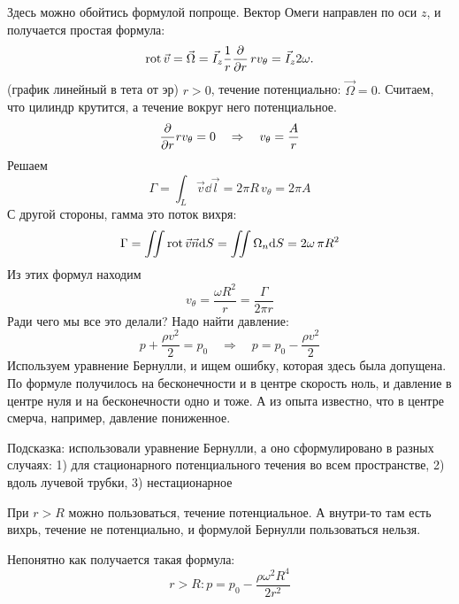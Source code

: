 Здесь можно обойтись формулой попроще. Вектор Омеги направлен по оси $z$, и получается простая формула: 
\begin{equation}
	\operatorname{rot}\vec{v}=
		\vec\Omega=
		\vec{I}_z \frac{1}{r}\pdv{r}\,rv_\theta=
		\vec{I}_z 2\omega.
\end{equation}
(график линейный в тета от эр)
$r>0$, течение потенциально: $\vec{\Omega}=0$. Считаем, что цилиндр крутится, а течение вокруг него потенциальное.
\begin{equation}
 	\pdv{r} rv_\theta=0 \quad \Rightarrow \quad v_\theta=\frac{A}{r}
 \end{equation} 
Решаем
\begin{equation}
	\Gamma=\int_L \vec{v}\dd\vec{l}=2\pi R\, v_\theta= 2\pi A
\end{equation}
С другой стороны, гамма это поток вихря:
\begin{equation}
	\Gamma=\iint \operatorname{rot}\vec{v}\vec{n}\dd S =\iint  \Omega_n \dd S = 2\omega\, \pi R^2
\end{equation}
Из этих формул находим
\begin{equation}
	v_\theta=\frac{\omega R^2}{r}=\frac{\Gamma}{2\pi r}
\end{equation}
Ради чего мы все это делали? Надо найти давление:
\begin{equation}
	p+\frac{\rho v^2}{2}=p_0 \quad \Rightarrow \quad
	p=p_0-\frac{\rho v^2}{2}
\end{equation}
Используем уравнение Бернулли, и ищем ошибку, которая здесь была допущена. По формуле получилось на бесконечности и в центре скорость ноль, и давление в центре нуля и на бесконечности одно и тоже. А из опыта известно, что в центре смерча, например, давление пониженное.

Подсказка: использовали уравнение Бернулли, а оно сформулировано в разных случаях: 1) для стационарного потенциального течения во всем пространстве, 2) вдоль лучевой трубки, 3) нестационарное

При $r>R$ можно пользоваться, течение потенциальное. А внутри-то там есть вихрь, течение не потенциально, и формулой Бернулли пользоваться нельзя.

Непонятно как получается такая формула:
\begin{equation}
	r>R: p=p_0-\frac{\rho\omega^2 R^4}{2r^2}
\end{equation}

